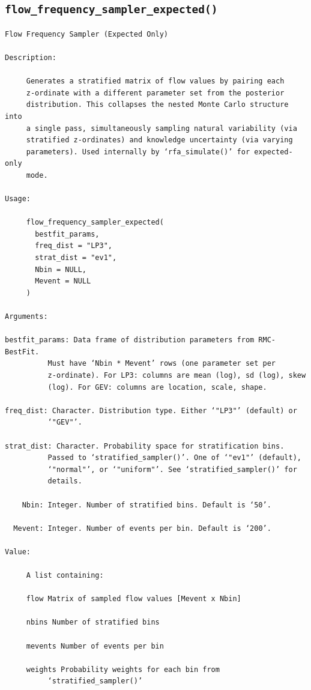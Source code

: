 \documentclass[
  letterpaper,
  DIV=11,
  numbers=noendperiod]{scrreprt}
\begin{document}
\subsection{\texorpdfstring{\texttt{flow\_frequency\_sampler\_expected()}}{flow\_frequency\_sampler\_expected()}}\label{flow_frequency_sampler_expected}

\begin{verbatim}
Flow Frequency Sampler (Expected Only)

Description:

     Generates a stratified matrix of flow values by pairing each
     z-ordinate with a different parameter set from the posterior
     distribution. This collapses the nested Monte Carlo structure into
     a single pass, simultaneously sampling natural variability (via
     stratified z-ordinates) and knowledge uncertainty (via varying
     parameters). Used internally by ‘rfa_simulate()’ for expected-only
     mode.

Usage:

     flow_frequency_sampler_expected(
       bestfit_params,
       freq_dist = "LP3",
       strat_dist = "ev1",
       Nbin = NULL,
       Mevent = NULL
     )
     
Arguments:

bestfit_params: Data frame of distribution parameters from RMC-BestFit.
          Must have ‘Nbin * Mevent’ rows (one parameter set per
          z-ordinate). For LP3: columns are mean (log), sd (log), skew
          (log). For GEV: columns are location, scale, shape.

freq_dist: Character. Distribution type. Either ‘"LP3"’ (default) or
          ‘"GEV"’.

strat_dist: Character. Probability space for stratification bins.
          Passed to ‘stratified_sampler()’. One of ‘"ev1"’ (default),
          ‘"normal"’, or ‘"uniform"’. See ‘stratified_sampler()’ for
          details.

    Nbin: Integer. Number of stratified bins. Default is ‘50’.

  Mevent: Integer. Number of events per bin. Default is ‘200’.

Value:

     A list containing:

     flow Matrix of sampled flow values [Mevent x Nbin]

     nbins Number of stratified bins

     mevents Number of events per bin

     weights Probability weights for each bin from
          ‘stratified_sampler()’


\end{verbatim}
\end{document}
